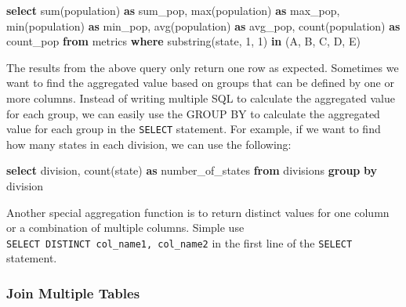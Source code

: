 \documentclass[
  12pt,
]{krantz}
\makeatletter
\newenvironment{Shaded}{\begin{snugshade}}{\end{snugshade}}
\newcommand{\DecValTok}[1]{\textcolor[rgb]{0.06,0.06,0.06}{#1}}
\newcommand{\FunctionTok}[1]{\textcolor[rgb]{0,0,0}{#1}}
\newcommand{\KeywordTok}[1]{\textcolor[rgb]{0.27,0.27,0.27}{\textbf{#1}}}
\newcommand{\NormalTok}[1]{#1}
\newcommand{\StringTok}[1]{\textcolor[rgb]{0.5,0.5,0.5}{#1}}
\newenvironment{kframe}{%
\medskip{}
\setlength{\fboxsep}{.8em}
 \def\at@end@of@kframe{}%
 \ifinner\ifhmode%
  \def\at@end@of@kframe{\end{minipage}}%
  \begin{minipage}{\columnwidth}%
 \fi\fi%
 \def\FrameCommand##1{\hskip\@totalleftmargin \hskip-\fboxsep
 \colorbox{shadecolor}{##1}\hskip-\fboxsep
     \hskip-\linewidth \hskip-\@totalleftmargin \hskip\columnwidth}%
 \MakeFramed {\advance\hsize-\width
   \@totalleftmargin\z@ \linewidth\hsize
   \@setminipage}}%
 {\par\unskip\endMakeFramed%
 \at@end@of@kframe}
\renewenvironment{Shaded}{\begin{kframe}}{\end{kframe}}
\makeatother
\begin{document}
\begin{Shaded}
\begin{Highlighting}[]
\KeywordTok{select} \FunctionTok{sum}\NormalTok{(population) }\KeywordTok{as}\NormalTok{ sum\_pop, }\FunctionTok{max}\NormalTok{(population) }\KeywordTok{as}
\NormalTok{max\_pop, }\FunctionTok{min}\NormalTok{(population) }\KeywordTok{as}\NormalTok{ min\_pop, }\FunctionTok{avg}\NormalTok{(population)}
\KeywordTok{as}\NormalTok{ avg\_pop, }\FunctionTok{count}\NormalTok{(population) }\KeywordTok{as}\NormalTok{ count\_pop}
\KeywordTok{from}\NormalTok{ metrics}
\KeywordTok{where}\NormalTok{ substring(state, }\DecValTok{1}\NormalTok{, }\DecValTok{1}\NormalTok{) }\KeywordTok{in}\NormalTok{ (}\StringTok{\textquotesingle{}A\textquotesingle{}}\NormalTok{, }\StringTok{\textquotesingle{}B\textquotesingle{}}\NormalTok{, }\StringTok{\textquotesingle{}C\textquotesingle{}}\NormalTok{, }\StringTok{\textquotesingle{}D\textquotesingle{}}\NormalTok{, }\StringTok{\textquotesingle{}E\textquotesingle{}}\NormalTok{)}
\end{Highlighting}
\end{Shaded}

The results from the above query only return one row as expected. Sometimes we want to find the aggregated value based on groups that can be defined by one or more columns. Instead of writing multiple SQL to calculate the aggregated value for each group, we can easily use the GROUP BY to calculate the aggregated value for each group in the \texttt{SELECT} statement. For example, if we want to find how many states in each division, we can use the following:

\begin{Shaded}
\begin{Highlighting}[]
\KeywordTok{select}\NormalTok{ division, }\FunctionTok{count}\NormalTok{(state) }\KeywordTok{as}\NormalTok{ number\_of\_states}
\KeywordTok{from}\NormalTok{ divisions}
\KeywordTok{group} \KeywordTok{by}\NormalTok{ division}
\end{Highlighting}
\end{Shaded}

Another special aggregation function is to return distinct values for one column or a combination of multiple columns. Simple use \texttt{SELECT\ DISTINCT\ col\_name1,\ col\_name2} in the first line of the \texttt{SELECT} statement.

\hypertarget{join-multiple-tables}{%
\subsubsection{Join Multiple Tables}\label{join-multiple-tables}}
\end{document}
